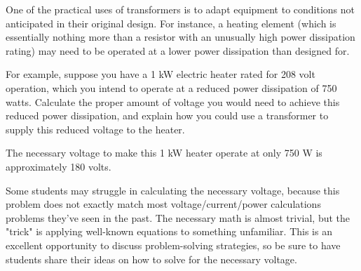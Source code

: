 

One of the practical uses of transformers is to adapt equipment to conditions not anticipated in their original design.  For instance, a heating element (which is essentially nothing more than a resistor with an unusually high power dissipation rating) may need to be operated at a lower power dissipation than designed for.  

For example, suppose you have a 1 kW electric heater rated for 208 volt operation, which you intend to operate at a reduced power dissipation of 750 watts.  Calculate the proper amount of voltage you would need to achieve this reduced power dissipation, and explain how you could use a transformer to supply this reduced voltage to the heater.







The necessary voltage to make this 1 kW heater operate at only 750 W is approximately 180 volts.







Some students may struggle in calculating the necessary voltage, because this problem does not exactly match most voltage/current/power calculations problems they've seen in the past.  The necessary math is almost trivial, but the "trick" is applying well-known equations to something unfamiliar.  This is an excellent opportunity to discuss problem-solving strategies, so be sure to have students share their ideas on how to solve for the necessary voltage.




